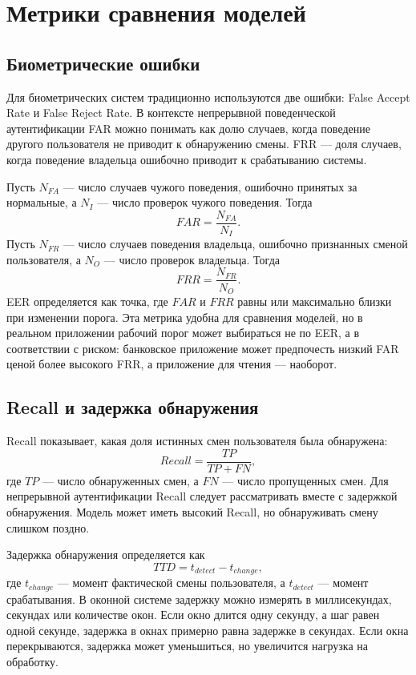 \documentclass[oneside,senior,etd]{BYUPhys}
\begin{document}
\section{Метрики сравнения моделей}

\subsection{Биометрические ошибки}

Для биометрических систем традиционно используются две ошибки: False Accept Rate и False Reject Rate. В контексте непрерывной поведенческой аутентификации FAR можно понимать как долю случаев, когда поведение другого пользователя не приводит к обнаружению смены. FRR --- доля случаев, когда поведение владельца ошибочно приводит к срабатыванию системы.

Пусть $N_{FA}$ --- число случаев чужого поведения, ошибочно принятых за нормальные, а $N_I$ --- число проверок чужого поведения. Тогда
\[
    FAR = \frac{N_{FA}}{N_I}.
\]
Пусть $N_{FR}$ --- число случаев поведения владельца, ошибочно признанных сменой пользователя, а $N_O$ --- число проверок владельца. Тогда
\[
    FRR = \frac{N_{FR}}{N_O}.
\]
EER определяется как точка, где $FAR$ и $FRR$ равны или максимально близки при изменении порога. Эта метрика удобна для сравнения моделей, но в реальном приложении рабочий порог может выбираться не по EER, а в соответствии с риском: банковское приложение может предпочесть низкий FAR ценой более высокого FRR, а приложение для чтения --- наоборот.

\subsection{Recall и задержка обнаружения}

Recall показывает, какая доля истинных смен пользователя была обнаружена:
\[
    Recall = \frac{TP}{TP + FN},
\]
где $TP$ --- число обнаруженных смен, а $FN$ --- число пропущенных смен. Для непрерывной аутентификации Recall следует рассматривать вместе с задержкой обнаружения. Модель может иметь высокий Recall, но обнаруживать смену слишком поздно.

Задержка обнаружения определяется как
\[
    TTD = t_{detect} - t_{change},
\]
где $t_{change}$ --- момент фактической смены пользователя, а $t_{detect}$ --- момент срабатывания. В оконной системе задержку можно измерять в миллисекундах, секундах или количестве окон. Если окно длится одну секунду, а шаг равен одной секунде, задержка в окнах примерно равна задержке в секундах. Если окна перекрываются, задержка может уменьшиться, но увеличится нагрузка на обработку.
\end{document}

